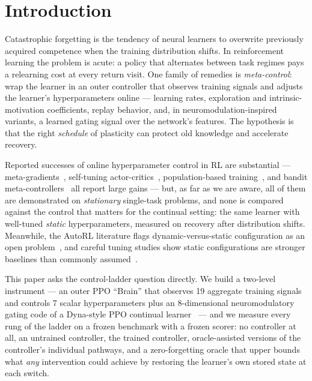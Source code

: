 \documentclass[11pt]{article}
\begin{document}
\section{Introduction}
\label{sec:intro}

Catastrophic forgetting is the tendency of neural learners to overwrite
previously acquired competence when the training distribution shifts. In
reinforcement learning the problem is acute: a policy that alternates between
task regimes pays a relearning cost at every return visit. One family of
remedies is \emph{meta-control}: wrap the learner in an outer controller that
observes training signals and adjusts the learner's hyperparameters online ---
learning rates, exploration and intrinsic-motivation coefficients, replay
behavior, and, in neuromodulation-inspired variants, a learned gating signal
over the network's features. The hypothesis is that the right \emph{schedule}
of plasticity can protect old knowledge and accelerate recovery.

Reported successes of online hyperparameter control in RL are substantial ---
meta-gradients~\citep{xu2018metagradient}, self-tuning
actor-critics~\citep{zahavy2020stac}, population-based
training~\citep{jaderberg2017pbt}, and bandit meta-controllers~\citep{badia2020agent57}
all report large gains --- but, as far as we are aware, all of them are
demonstrated on \emph{stationary} single-task problems, and none is compared
against the control that matters for the continual setting: the same learner
with well-tuned \emph{static} hyperparameters, measured on recovery after
distribution shifts. Meanwhile, the AutoRL literature flags
dynamic-versus-static configuration as an open problem~\citep{parkerholder2022autorl},
and careful tuning studies show static configurations are stronger baselines
than commonly assumed~\citep{eimer2023hyperparameters,andrychowicz2021whatmatters}.

This paper asks the control-ladder question directly. We build a two-level
instrument --- an outer PPO ``Brain'' that observes 19 aggregate training
signals and controls 7 scalar hyperparameters plus an 8-dimensional
neuromodulatory gating code of a Dyna-style PPO continual
learner~\citep{schulman2017ppo,sutton1990dyna} --- and we measure every rung of
the ladder on a frozen benchmark with a frozen scorer: no controller at all,
an untrained controller, the trained controller, oracle-assisted versions of
the controller's individual pathways, and a zero-forgetting oracle that upper
bounds what \emph{any} intervention could achieve by restoring the learner's
own stored state at each switch.
\end{document}
